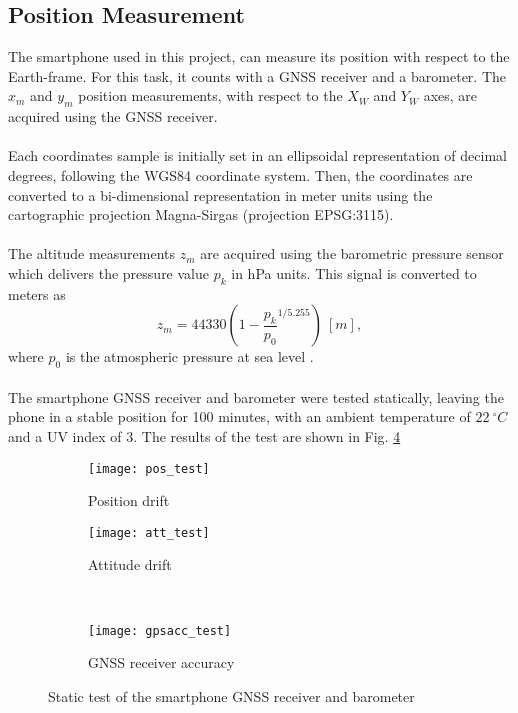 \subsection{Position Measurement}
The smartphone used in this project, can measure its position with respect to the Earth-frame. For this task, it counts with a GNSS receiver and a barometer.
The $x_{m}$ and $y_{m}$ position measurements, with respect to the $X_W$ and $Y_W$ axes, are acquired using the GNSS receiver. 
\\\\
Each coordinates sample is initially set in an ellipsoidal representation of decimal degrees, following the WGS84 coordinate system. Then, the coordinates are converted to a bi-dimensional representation in meter units using the cartographic projection Magna-Sirgas (projection EPSG:3115).
\\\\
The altitude measurements $z_{m}$ are acquired using the barometric pressure sensor which delivers the pressure value $p_k$ in hPa units. This signal is converted to meters as
\begin{equation}\label{eqn:hbarom}
z_{m} = 44330\left(1-\frac{p_k}{p_{0}}^{1/5.255}\right)\ [m],
\end{equation}
where $p_{0}$ is the atmospheric pressure at sea level \cite{Lauszus2015}.
\\\\
The smartphone GNSS receiver and barometer were tested statically, leaving the phone in a stable position for 100 minutes, with an ambient temperature of $22\ ^{\circ}C$ and a UV index of $3$. The results of the test are shown in Fig. \ref{fig:sensorstest}
\begin{figure}[h]
\begin{subfigure}{.5\linewidth}
\centering
\texttt{[image: pos\_test]}
\caption{Position drift}
\label{fig:pos_test}
\end{subfigure}%
\begin{subfigure}{.5\linewidth}
\centering
\texttt{[image: att\_test]}
\caption{Attitude drift}
\label{fig:att_test}
\end{subfigure}\\[1ex]
\begin{subfigure}{\linewidth}
\centering
\texttt{[image: gpsacc\_test]}
\caption{GNSS receiver accuracy}
\label{fig:gpsacc_test}
\end{subfigure}
\caption{Static test of the smartphone GNSS receiver and barometer}
\label{fig:sensorstest}
\end{figure}
